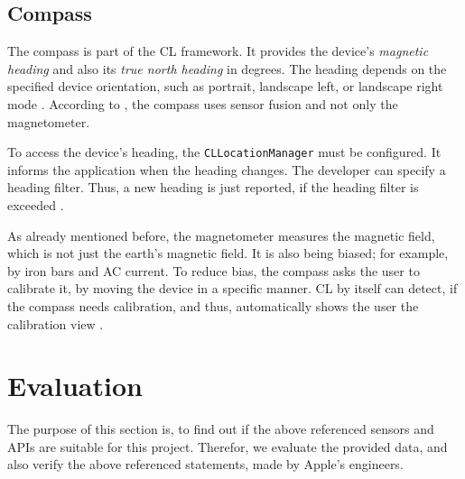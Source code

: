 \subsection{Compass}
The compass is part of the \ac{CL} framework. It provides the device's \emph{magnetic heading} and also its \emph{true north heading} in degrees. The heading depends on the specified device orientation, such as portrait, landscape left, or landscape right mode \citep{apple:ios_doc_cl}. According to \citet{apple:wwdc_2012_pham}, the compass uses sensor fusion and not only the magnetometer.

To access the device's heading, the \texttt{CLLocationManager} must be configured. It informs the application when the heading changes. The developer can specify a heading filter. Thus, a new heading is just reported, if the heading filter is exceeded \citep{apple:ios_doc_cl}.

As already mentioned before, the magnetometer measures the magnetic field, which is not just the earth's magnetic field. It is also being biased; for example, by iron bars and AC current. To reduce bias, the compass asks the user to calibrate it, by moving the device in a specific manner. \ac{CL} by itself can detect, if the compass needs calibration, and thus, automatically shows the user the calibration view \citep{apple:ios_doc_cl}.


\section{Evaluation}\label{sec:sensor_eval}
The purpose of this section is, to find out if the above referenced sensors and \acsp{API} are suitable for this project. Therefor, we evaluate the provided data, and also verify the above referenced statements, made by Apple's engineers.


